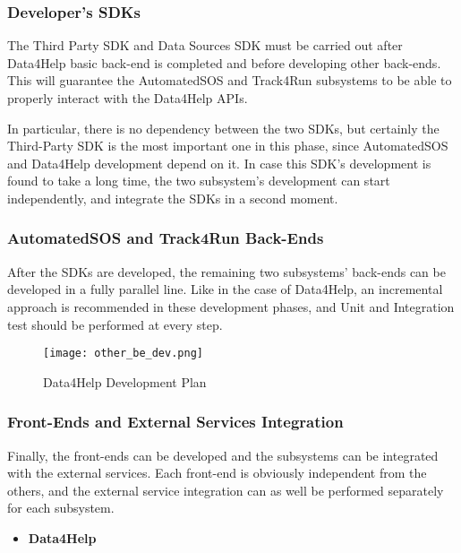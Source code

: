 \subsubsection{Developer's SDKs}
The Third Party SDK and Data Sources SDK must be carried out after Data4Help basic back-end is completed and before developing other back-ends. This will guarantee the AutomatedSOS and Track4Run subsystems to be able to properly interact with the Data4Help APIs.

In particular, there is no dependency between the two SDKs, but certainly the Third-Party SDK is the most important one in this phase, since AutomatedSOS and Data4Help development depend on it. In case this SDK's development is found to take a long time, the two subsystem's development can start independently, and integrate the SDKs in a second moment.

\subsubsection{AutomatedSOS and Track4Run Back-Ends}
After the SDKs are developed, the remaining two subsystems' back-ends can be developed in a fully parallel line. Like in the case of Data4Help, an incremental approach is recommended in these development phases, and Unit and Integration test should be performed at every step.

\FloatBarrier
\begin{figure}[!h]
	\centering
	\texttt{[image: other\_be\_dev.png]}
	\caption{Data4Help Development Plan}
\end{figure}
\FloatBarrier

\subsubsection{Front-Ends and External Services Integration}
Finally, the front-ends can be developed and the subsystems can be integrated with the external services. Each front-end is obviously independent from the others, and the external service integration can as well be performed separately for each subsystem.

\begin{itemize}
	\item \textbf{Data4Help}
\end{itemize}

